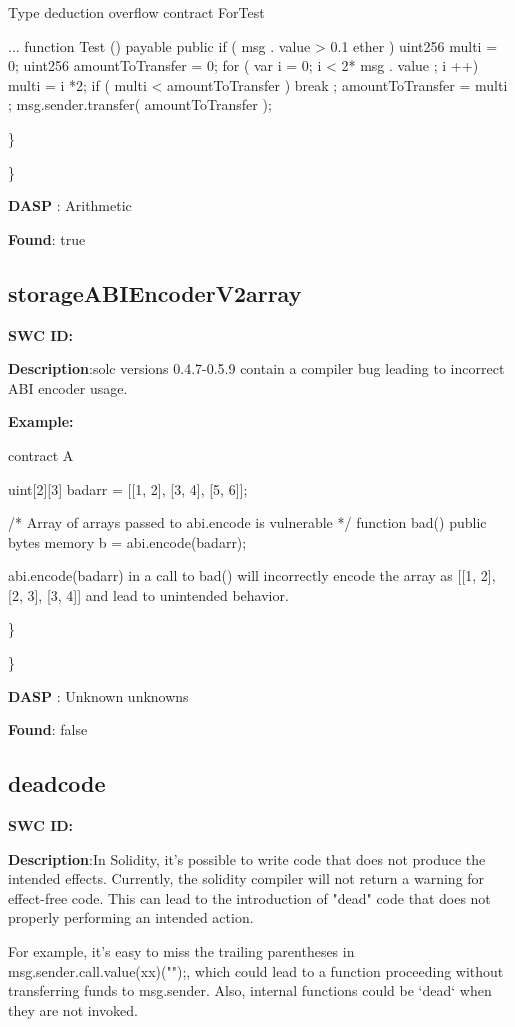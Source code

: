 \documentclass{article}
\begin{document}
Type deduction overflow
contract For\textunderscore Test {
...
  function Test () payable public {
    if ( msg . value > 0.1 ether ) {
      uint256 multi = 0;
      uint256 amountToTransfer = 0;
      for ( var i = 0; i < 2* msg . value ; i ++) {
        multi = i *2;
        if ( multi < amountToTransfer ) {
          break ;
        amountToTransfer = multi ;
      }
      msg.sender.transfer( amountToTransfer );
    }
  }
}

\} 

\} 

\textbf{DASP} : Arithmetic

\textbf{Found}: true

\subsection{storage\textunderscore ABIEncoderV2\textunderscore array} 
\textbf{SWC \textunderscore ID:} 

\textbf{Description}:solc versions 0.4.7-0.5.9 contain a compiler bug leading to incorrect ABI encoder usage.


\textbf{Example:} 

contract A {
    uint[2][3] bad\textunderscore arr = [[1, 2], [3, 4], [5, 6]];

    /* Array of arrays passed to abi.encode is vulnerable */
    function bad() public {
        bytes memory b = abi.encode(bad\textunderscore arr);
    }
}

abi.encode(bad\textunderscore arr) in a call to bad() will incorrectly encode the array as [[1, 2], [2, 3], [3, 4]] and lead to unintended behavior.

\} 

\} 

\textbf{DASP} : Unknown unknowns

\textbf{Found}: false

\subsection{dead\textunderscore code} 
\textbf{SWC \textunderscore ID:} 

\textbf{Description}:In Solidity, it's possible to write code that does not produce the intended effects. Currently, the solidity compiler will not return a warning for effect-free code. This can lead to the introduction of "dead" code that does not properly performing an intended action.

For example, it's easy to miss the trailing parentheses in msg.sender.call.value(xx)("");, which could lead to a function proceeding without transferring funds to msg.sender. Also, internal functions could be `dead` when they are not invoked.


}
\end{document}
